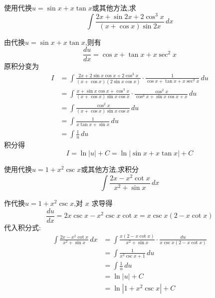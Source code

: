 \begin{questions}
    \question 使用代换$u = \sin x + x \tan x$或其他方法,求
    \[
    \int \frac{2x + \sin 2x + 2\cos^3 x}{(x + \cos x)\sin 2x} \, dx
    \]
    \begin{solution}
        由代换$u = \sin x + x \tan x$,则有
        \[
        \frac{du}{dx} = \cos x + \tan x + x \sec^2 x
        \]
        原积分变为
        \begin{align*}
        I &= \int \frac{2x + 2\sin x \cos x + 2\cos^3 x}{(x + \cos x)(2\sin x \cos x)} \cdot \frac{1}{\cos x + \tan x + x \sec^2 x} \, du \\
        &= \int \frac{x + \sin x \cos x + \cos^3 x}{(x + \cos x)\sin x \cos x} \cdot \frac{\cos^2 x}{\cos^3 x + \sin x \cos x + x} \, du \\
        &= \int \frac{\cos^2 x}{(x + \cos x)\sin x \cos x} \, du \\
        &= \int \frac{1}{x \tan x + \sin x} \, du \\
        &= \int \frac{1}{u} \, du 
        \end{align*}
        积分得
        \[
        I = \ln|u| + C = \ln|\sin x + x \tan x| + C
        \]
    \end{solution}

    \question 使用代换$u = 1 + x^2 \csc x$或其他方法,求积分
    \[
    \int \frac{2x - x^2 \cot x}{x^2 + \sin x} \, dx
    \]
    \begin{solution}
        作代换$u = 1 + x^2 \csc x$,对 $x$ 求导得
        \[
        \frac{du}{dx} = 2x \csc x - x^2 \csc x \cot x = x \csc x (2 - x \cot x)
        \]
        代入积分式:
        \begin{align*}
        \int \frac{2x - x^2 \cot x}{x^2 + \sin x} \, dx &= \int \frac{x (2 - x \cot x)}{x^2 + \sin x} \cdot \frac{du}{x \csc x (2 - x \cot x)} \\
        &= \int \frac{1}{x^2 \csc x + 1} \, du \\
        &= \int \frac{1}{u} \, du \\
        &= \ln|u| + C \\
        &= \ln|1 + x^2 \csc x| + C
        \end{align*}
    \end{solution}

    \question 
    \begin{parts}

\end{parts}
\end{questions}
